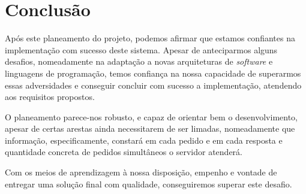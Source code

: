 \documentclass[12pt]{article} %
\begin{document}
\section{Conclusão}
Após este planeamento do projeto, podemos afirmar que estamos confiantes na implementação com sucesso deste sistema. Apesar de anteciparmos alguns desafios, nomeadamente na adaptação a novas arquiteturas de \textit{software} e linguagens de programação, temos confiança na nossa capacidade de superarmos essas adversidades e conseguir concluir com sucesso a implementação, atendendo aos requisitos propostos.\par
O planeamento parece-nos robusto, e capaz de orientar bem o desenvolvimento, apesar de certas arestas ainda necessitarem de ser limadas, nomeadamente que informação, especificamente, constará em cada pedido e em cada resposta e quantidade concreta de pedidos simultâneos o servidor atenderá.\par
Com os meios de aprendizagem à nossa disposição, empenho e vontade de entregar uma solução final com qualidade, conseguiremos superar este desafio.\par

\pagebreak
\end{document}
